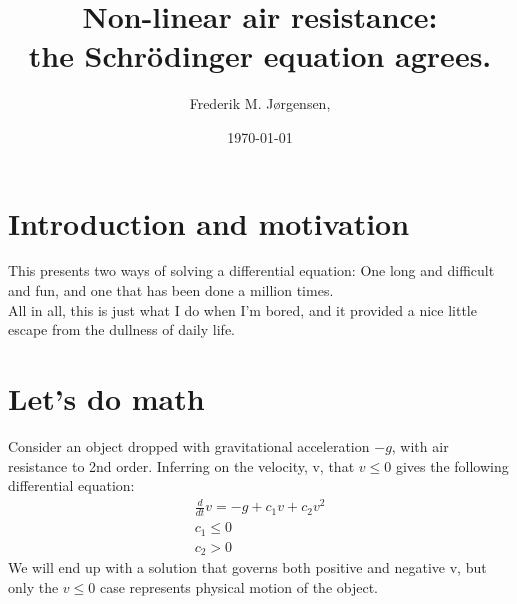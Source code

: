 \documentclass[english,a4paper,oneside,article,9pt]{memoir}
\title{Non-linear air resistance:\\
the Schrödinger equation agrees.}
\author{Frederik M. Jørgensen,\\

}
\date{\today} %
\begin{document}
\maketitle


%
\twocolumn
\chapter{Introduction and motivation}
This presents two ways of solving a differential equation: One long and difficult and fun, and one that has been done a million times.\\
All in all, this is just what I do when I'm bored, and it provided a nice little escape from the dullness of daily life.


\chapter{Let's do math}
Consider an object dropped with gravitational acceleration $-g$, with air resistance to 2nd order. Inferring on the velocity, v, that $v\leq 0$ gives the following differential equation:
\begin{align*}
\frac{d}{dt} v=-g+c_1v+c_2v^2\\
c_1\leq 0\\
c_2>0
\end{align*}
We will end up with a solution that governs both positive and negative v, but only the $v\leq 0$ case represents physical motion of the object.
\end{document}
